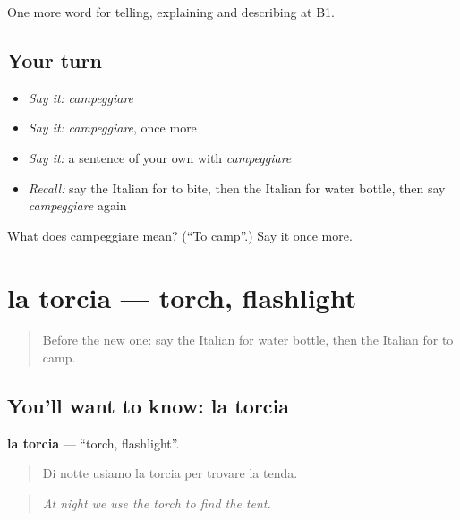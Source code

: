 \begin{grammarlens}[title={What you've built}]
One more word for telling, explaining and describing at B1.
\end{grammarlens}

\subsection*{Your turn}
\begin{itemize}
\raggedright
  \item \emph{Say it:} \emph{campeggiare}
  \item \emph{Say it:} \emph{campeggiare}, once more
  \item \emph{Say it:} a sentence of your own with \emph{campeggiare}
  \item \emph{Recall:} say the Italian for to bite, then the Italian for water bottle, then say \emph{campeggiare} again
\end{itemize}

\begin{tcolorbox}[breakable,colback=teal!4,colframe=teal!35!black,title={Before you move on}]
What does campeggiare mean? (\textquotedblleft{}To camp\textquotedblright{}.) Say it once more.
\end{tcolorbox}
\section[la torcia]{la torcia — torch, flashlight}

\label{lesson:IT-C502-torcia}



\begin{quote}
Before the new one: say the Italian for water bottle, then the Italian for to camp.
\end{quote}

\subsection*{You'll want to know: la torcia}
\textbf{la torcia} — \textquotedblleft{}torch, flashlight\textquotedblright{}.

\begin{quote}
Di notte usiamo la torcia per trovare la tenda.
\end{quote}

\begin{quote}
\emph{At night we use the torch to find the tent.}
\end{quote}

